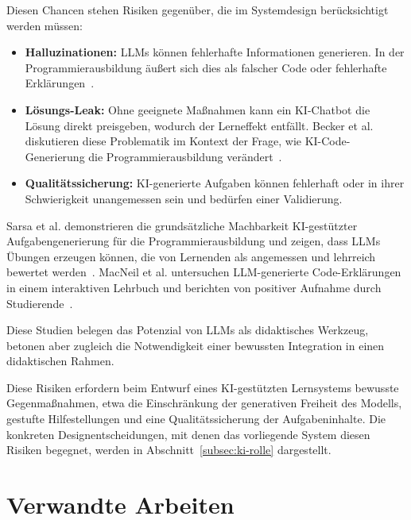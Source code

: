 \clearpage

Diesen Chancen stehen Risiken gegenüber, die im Systemdesign berücksichtigt werden müssen:

\begin{itemize}
    \item \textbf{Halluzinationen:} LLMs können fehlerhafte Informationen generieren. In der Programmierausbildung äußert sich dies als falscher Code oder fehlerhafte Erklärungen~\cite{becker2023}.
    \item \textbf{Lösungs-Leak:} Ohne geeignete Maßnahmen kann ein KI-Chatbot die Lösung direkt preisgeben, wodurch der Lerneffekt entfällt. Becker et al. diskutieren diese Problematik im Kontext der Frage, wie KI-Code-Generierung die Programmierausbildung verändert~\cite{becker2023}.
    \item \textbf{Qualitätssicherung:} KI-generierte Aufgaben können fehlerhaft oder in ihrer Schwierigkeit unangemessen sein und bedürfen einer Validierung.
\end{itemize}

Sarsa et al. demonstrieren die grundsätzliche Machbarkeit KI-gestützter Aufgabengenerierung für die Programmierausbildung und zeigen, dass LLMs Übungen erzeugen können, die von Lernenden als angemessen und lehrreich bewertet werden~\cite{sarsa2022}. MacNeil et al. untersuchen LLM-generierte Code-Erklärungen in einem interaktiven Lehrbuch und berichten von positiver Aufnahme durch Studierende~\cite{macneil2023}. 

Diese Studien belegen das Potenzial von LLMs als didaktisches Werkzeug, betonen aber zugleich die Notwendigkeit einer bewussten Integration in einen didaktischen Rahmen.

Diese Risiken erfordern beim Entwurf eines KI-gestützten Lernsystems bewusste Gegenmaßnahmen, etwa die Einschränkung der generativen Freiheit des Modells, gestufte Hilfestellungen und eine Qualitätssicherung der Aufgabeninhalte. Die konkreten Designentscheidungen, mit denen das vorliegende System diesen Risiken begegnet, werden in Abschnitt~\ref{subsec:ki-rolle} dargestellt.



\section{Verwandte Arbeiten}\label{sec:verwandte-arbeiten}

